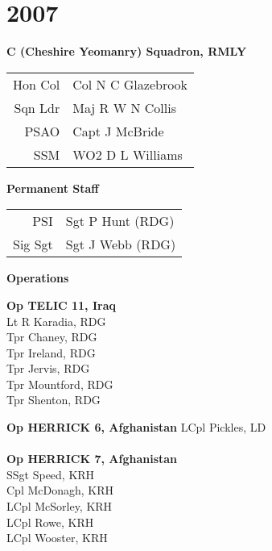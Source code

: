 \chapter*{2007}

\vspace*{10mm}

\begin{center}
  \Large
  \textbf{C (Cheshire Yeomanry) Squadron, RMLY}
\end{center}

\begin{center}
  \begin{tabular}{rl}
    Hon Col & Col N C Glazebrook \\
    Sqn Ldr & Maj R W N Collis \\
    PSAO & Capt J McBride \\
    SSM & WO2 D L Williams \\
  \end{tabular}
\end{center}

\vspace*{10mm}

\begin{center}
  \Large
  \textbf{Permanent Staff}
\end{center}

\begin{center}
  \begin{tabular}{rl}
    PSI & Sgt P Hunt (RDG) \\
    Sig Sgt & Sgt J Webb (RDG) \\
  \end{tabular}
\end{center}

\vspace*{10mm}

\begin{center}
  \Large
  \textbf{Operations}
\end{center}

\begin{multicols}{2}
  \noindent
  \textbf{Op TELIC 11, Iraq} \\
  Lt R Karadia, RDG \\
  Tpr Chaney, RDG \\
  Tpr Ireland, RDG \\
  Tpr Jervis, RDG \\
  Tpr Mountford, RDG \\
  Tpr Shenton, RDG

  \columnbreak
  
  \noindent
  \textbf{Op HERRICK 6, Afghanistan}
  LCpl Pickles, LD \\
  \\
  \textbf{Op HERRICK 7, Afghanistan} \\
  SSgt Speed, KRH \\
  Cpl McDonagh, KRH \\
  LCpl McSorley, KRH \\
  LCpl Rowe, KRH \\
  LCpl Wooster, KRH \\
\end{multicols}

